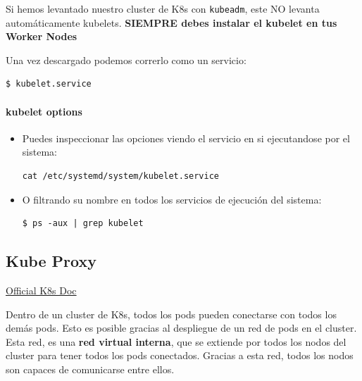 \documentclass{article}
\newenvironment{blocktemplateIII}[1]{%
    \tcolorbox[beamer,%
    noparskip,breakable,
    ,colframe=Red,%
    colbacklower=LimeGreen!75!LightGreen,%
    title=#1]}%
    {\endtcolorbox}
\newenvironment{codetemplate}[1][]{%
  \mybasecolorbox[#1]
  \itshape
}{%
  \endmybasecolorbox
}
\begin{document}
\begin{blocktemplateIII}{Warning}
Si hemos levantado nuestro cluster de K8s con \verb|kubeadm|, este NO levanta automáticamente kubelets. \textbf{SIEMPRE debes instalar el kubelet en tus Worker Nodes}
\end{blocktemplateIII}

Una vez descargado podemos correrlo como un servicio:

\begin{codetemplate}{}
\begin{verbatim}
$ kubelet.service
\end{verbatim}
\end{codetemplate}

\paragraph{kubelet options}

\begin{itemize}
    \item Puedes inspeccionar las opciones viendo el servicio en si ejecutandose por el sistema:
\begin{codetemplate}{}
\begin{verbatim}
cat /etc/systemd/system/kubelet.service
\end{verbatim}
\end{codetemplate}

    \item O filtrando su nombre en todos los servicios de ejecución del sistema:
\begin{codetemplate}{}
\begin{verbatim}
$ ps -aux | grep kubelet
\end{verbatim}
\end{codetemplate}
\end{itemize}

\subsection{Kube Proxy}

\href{https://kubernetes.io/docs/reference/command-line-tools-reference/kube-proxy/}{Official K8s Doc}

Dentro de un cluster de K8s, todos los pods pueden conectarse con todos los demás pods. Esto es posible gracias al despliegue de un red de pods en el cluster. Esta red, es una \textbf{red virtual interna}, que se extiende por todos los nodos del cluster para tener todos los pods conectados. Gracias a esta red, todos los nodos son capaces de comunicarse entre ellos.
\end{document}
